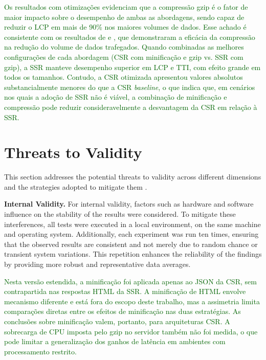 \documentclass{sbc2019}%
\begin{document}
\textcolor{darkgreen}{Os resultados com otimizações evidenciam que a compressão gzip é o fator de maior impacto sobre o desempenho de ambas as abordagens, sendo capaz de reduzir o LCP em mais de 90\% nos maiores volumes de dados. Esse achado é consistente com os resultados de \citet{jsonXmlApiResponse:2021} e \citet{dataConsumptionIot:2021}, que demonstraram a eficácia da compressão na redução do volume de dados trafegados. Quando combinadas as melhores configurações de cada abordagem (CSR com minificação e gzip vs. SSR com gzip), a SSR manteve desempenho superior em LCP e TTI, com efeito grande em todos os tamanhos. Contudo, a CSR otimizada apresentou valores absolutos substancialmente menores do que a CSR \textit{baseline}, o que indica que, em cenários nos quais a adoção de SSR não é viável, a combinação de minificação e compressão pode reduzir consideravelmente a desvantagem da CSR em relação à SSR.}

\section{Threats to Validity}\label{sec:threats_to_validity}

This section addresses the potential threats to validity across different dimensions and the strategies adopted to mitigate them \cite{book:wohlin}.

\textbf{Internal Validity.}
For internal validity, factors such as hardware and software influence on the stability of the results were considered. To mitigate these interferences, all tests were executed in a local environment, on the same machine and operating system. Additionally, each experiment was run ten times, ensuring that the observed results are consistent and not merely due to random chance or transient system variations. This repetition enhances the reliability of the findings by providing more robust and representative data averages.

\textcolor{darkgreen}{Nesta versão estendida, a minificação foi aplicada apenas ao JSON da CSR, sem contrapartida nas respostas HTML da SSR. A minificação de HTML envolve mecanismo diferente e está fora do escopo deste trabalho, mas a assimetria limita comparações diretas entre os efeitos de minificação nas duas estratégias. As conclusões sobre minificação valem, portanto, para arquiteturas CSR. A sobrecarga de CPU imposta pelo gzip no servidor também não foi medida, o que pode limitar a generalização dos ganhos de latência em ambientes com processamento restrito.}
\end{document}
